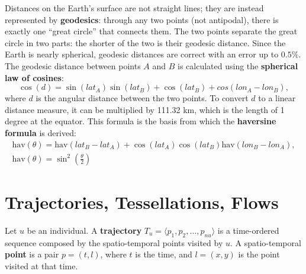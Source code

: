 Distances on the Earth's surface are not straight lines; they are instead represented by \textbf{geodesics}: through any two points (not antipodal), there is exactly one ``great circle'' that connects them. The two points separate the great circle in two parts: the shorter of the two is their geodesic distance. Since the Earth is nearly spherical, geodesic distances are correct with an error up to $0.5\%$. The geodesic distance between points $A$ and $B$ is calculated using the \textbf{spherical law of cosines}:
\begin{equation*}
    \cos(d) = \sin(\textit{lat}_A) \sin(\textit{lat}_B) + \cos(\textit{lat}_B) + cos(\textit{lon}_A - \textit{lon}_B),
\end{equation*}
where $d$ is the angular distance between the two points. To convert $d$ to a linear distance measure, it can be multiplied by 111.32 km, which is the length of 1 degree at the equator. This formula is the basis from which the \textbf{haversine formula} is derived:
\begin{gather*}
    \text{hav}(\theta) = \text{hav}(\textit{lat}_B - \textit{lat}_A) + \cos(\textit{lat}_A)\cos(\textit{lat}_B) \text{hav}(\textit{lon}_B - \textit{lon}_A),\\
    \text{hav}(\theta) = \sin^2(\frac{\theta}{2})
\end{gather*}

\section{Trajectories, Tessellations, Flows}

Let $u$ be an individual. A \textbf{trajectory} $T_u = \langle p_1, p_2, \dots, p_{nu} \rangle$ is a time-ordered sequence composed by the spatio-temporal points visited by $u$. A spatio-temporal \textbf{point} is a pair $p = (t,l)$, where $t$ is the time, and $l=(x,y)$ is the point visited at that time.


